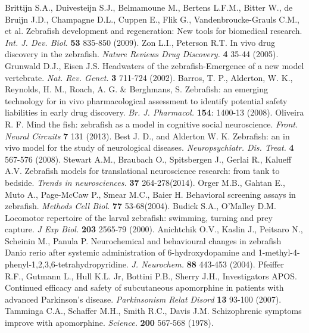 \documentclass[a4paper,12pt]{article}
\begin{document}
\begin{thebibliography}{99}
Brittijn S.A., Duivesteijn S.J., Belmamoune M., Bertens L.F.M., Bitter W., de Bruijn J.D., Champagne D.L., Cuppen E., Flik G., Vandenbroucke-Grauls C.M., et al. Zebrafish development and regeneration: New tools for biomedical research. \textit{Int. J. Dev. Biol.} \textbf{53} 835-850 (2009).
Zon L.I., Peterson R.T. In vivo drug discovery in the zebrafish. \textit{Nature Reviews Drug Discovery.} \textbf{4} 35-44 (2005).
Grunwald D.J., Eisen J.S. Headwaters of the zebrafish-Emergence of a new model vertebrate. \textit{Nat. Rev. Genet.} \textbf{3} 711-724 (2002).
Barros, T. P., Alderton, W. K., Reynolds, H. M., Roach, A. G. \& Berghmans, S. Zebrafish: an emerging technology for 
in vivo pharmacological assessment to identify potential safety liabilities in early drug discovery. \textit{Br. J. Pharmacol.}
\textbf{154}: 1400-13 (2008).
Oliveira R. F. Mind the fish: zebrafish as a model in cognitive social neuroscience. \textit{Front. Neural Circuits} \textbf{7} 131 (2013).
Best J. D., and Alderton W. K. Zebrafish: an in vivo model for the study of neurological diseases. \textit{Neuropsychiatr. Dis. Treat.}
\textbf{4} 567-576 (2008).
Stewart A.M., Braubach O., Spitsbergen J., Gerlai R., Kalueff A.V. Zebrafish models for translational neuroscience research: from tank to bedside. \textit{Trends in neurosciences.} \textbf{37} 264-278(2014).
Orger M.B., Gahtan E., Muto A., Page-McCaw P., Smear M.C., Baier H. Behavioral screening assays in zebrafish. \textit{Methods Cell Biol.} \textbf{77} 53-68(2004).
Budick S.A., O’Malley D.M. Locomotor repertoire of the larval zebrafish: swimming, turning and prey capture. \textit{J Exp Biol.} \textbf{203} 2565-79 (2000).
Anichtchik O.V., Kaslin J., Peitsaro N., Scheinin M., Panula P. Neurochemical and behavioural changes in zebrafish Danio rerio after systemic administration of 6-hydroxydopamine and 1-methyl-4-phenyl-1,2,3,6-tetrahydropyridine. \textit{J. Neurochem.} \textbf{88} 443-453 (2004). 
Pfeiffer R.F., Gutmann L., Hull K.L. Jr, Bottini P.B., Sherry J.H., Investigators APOS. Continued efficacy and safety of subcutaneous apomorphine in patients with advanced Parkinson's disease. \textit{Parkinsonism Relat Disord} \textbf{13} 93-100 (2007).
Tamminga C.A., Schaffer M.H., Smith R.C., Davis J.M. Schizophrenic symptoms improve with apomorphine. \textit{Science.} \textbf{200} 567-568 (1978).

\end{thebibliography}
\end{document}
